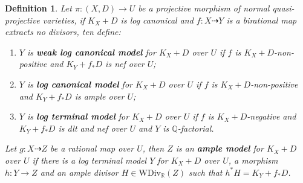 \documentclass{article}
\newtheorem{defn}{Definition}[section]
\begin{document}
\begin{defn}
  Let $ \pi:(X,D)\to U $ be a projective morphism of normal quasi-projective varieties, if $ K_X+D $ is log canonical and $ f:X\dashrightarrow Y $ is a birational map extracts no divisors, ten define:
  \begin{enumerate}
    \item $ Y $ is \textbf{ weak log canonical model} for $ K_X+D $ over $ U $ if $ f $ is $ K_X+D $-non-positive and $ K_Y+f_*D $ is nef over $ U $;
    \item $ Y $ is \textbf{ log canonical model} for $ K_X+D $ over $ U $ if $ f $ is $ K_X+D $-non-positive and $ K_Y+f_*D $ is ample over $ U $;
    \item $ Y $ is \textbf{ log terminal model} for $ K_X+D $ over $ U $ if $ f $ is $ K_X+D $-negative and $ K_Y+f_*D $ is dlt and nef over $ U $ and $ Y $ is $ \mathbb{Q} $-factorial.
  \end{enumerate}
  Let $ g:X\dashrightarrow Z $ be a rational map over $ U $, then $ Z $ is an \textbf{ample model } for $ K_X+D $ over $ U $ if there is a log terminal model $ Y $ for $ K_X+D $ over $ U $, a morphism $ h:Y\to Z $ and an ample divisor $ H\in \mathrm{WDiv}_\mathbb{R}(Z) $ such that $ h^*H=K_Y+f_*D $. 
\end{defn}
\end{document}
